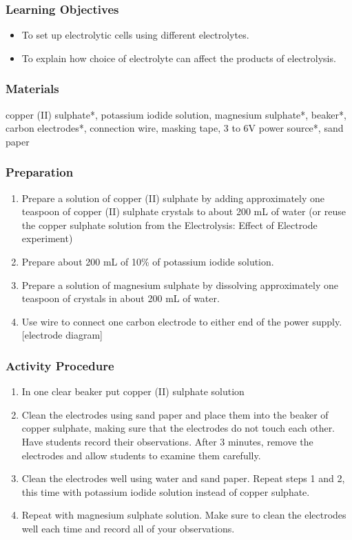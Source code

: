 \subsubsection*{Learning Objectives}
\begin{itemize}
\item{To set up electrolytic cells using different electrolytes.}
\item{To explain how choice of electrolyte can affect the products of electrolysis.}
\end{itemize}

\subsubsection*{Materials}
 copper (II) sulphate*, potassium iodide solution, magnesium sulphate*, beaker*, carbon electrodes*, connection wire, masking tape, 3 to 6V power source*, sand paper

\subsubsection*{Preparation}
\begin{enumerate}
\item{Prepare a solution of copper (II) sulphate by adding approximately one teaspoon of copper (II) sulphate crystals to about 200 mL of water (or reuse the copper sulphate solution from the Electrolysis: Effect of Electrode experiment)}
\item{Prepare about 200 mL of 10\% of potassium iodide solution.}
\item{Prepare a solution of magnesium sulphate by dissolving approximately one teaspoon of crystals in about 200 mL of water.}
\item{Use wire to connect one carbon electrode to either end of the power supply. [electrode diagram]}
\end{enumerate}

\subsubsection*{Activity Procedure}
\begin{enumerate}
\item{In one clear beaker put copper (II) sulphate solution}
\item{Clean the electrodes using sand paper and place them into the beaker of copper sulphate, making sure that the electrodes do not touch each other.  Have students record their observations. After 3 minutes, remove the electrodes and allow students to examine them carefully.}
\item{Clean the electrodes well using water and sand paper. Repeat steps 1 and 2, this time with potassium iodide solution instead of copper sulphate.}
\item{Repeat with magnesium sulphate solution. Make sure to clean the electrodes well each time and record all of your observations.}
\end{enumerate}

